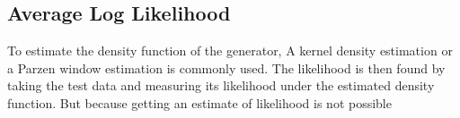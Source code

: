 \subsection{Average Log Likelihood}
\label{sub:Average Log Likelihoodt}

\begin{comment}

 Kernel density estimation and Parzen window estimation are used to estimate the density function of a distribution from samples.
 You take samples from your generator and 
 With the estimated density function defined you can use the Kullback-Leibler divergence or similar metrics to calculate the distance between the generated distribution and distribution of the test data.
 
 It doesn't work well :D lol
 when the data has high dimensionality a Parzen Window struggles to produce the true log-likelihood of a model.(AKA it is not very accurate)
 If the dimesnsionality is low still requires lots of samples to come close to the true log-likelihood.
 
 Because can't really estimate the log-likelihood very well even if dimensions is small.
 
\end{comment}

 To estimate the density function of the generator, A kernel density estimation or a Parzen window estimation is commonly used.
 The likelihood is then found by taking the test data and measuring its likelihood under the estimated density function.
 But because getting an estimate of likelihood is not possible 
 
